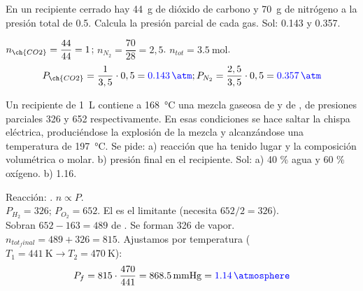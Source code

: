 \begin{exercise}
    En un recipiente cerrado hay \qty{44}{\g} de dióxido de carbono y \qty{70}{\g} de nitrógeno a la presión total de \qty{0.5}{\atm}. Calcula la presión parcial de cada gas.
    Sol: \qty{0.143}{\atm} y \qty{0.357}{\atm}.
    \begin{solu}
        $n_{\ch{CO2}} = \dfrac{44}{44} = 1$; $n_{N_2} = \dfrac{70}{28} = 2,5$. $n_{tot} = \qty{3,5}{\mol}$.
        \[ P_{\ch{CO2}} = \dfrac{1}{3,5} \cdot 0,5 = \mathbf{\textcolor{blue}{\qty{0,143}{\atm}}} ; P_{N_2} = \dfrac{2,5}{3,5} \cdot 0,5 = \mathbf{\textcolor{blue}{\qty{0,357}{\atm}}} \]
    \end{solu}
\end{exercise}

\begin{exercise}
    Un recipiente de \qty{1}{\L} contiene a \qty{168}{\celsius} una mezcla gaseosa de  y de , de presiones parciales 326 y 652 \unit{\mmhg} respectivamente. En esas condiciones se hace saltar la chispa eléctrica, produciéndose la explosión de la mezcla y alcanzándose una temperatura de  \qty{197}{\celsius}. Se pide: a) reacción que ha tenido lugar y la composición volumétrica o molar. b) presión final en el recipiente.
    Sol: a) 40 \% agua y 60 \% oxígeno. b) \qty{1.16}{\atm}.
    \begin{solu}
        Reacción: . $n \propto P$. \\
        $P_{H_2} = 326$; $P_{O_2} = 652$. El  es el limitante (necesita $652/2 = 326$). \\
        Sobran $652 - 163 = 489$ de . Se forman 326 de  vapor. \\
        $n_{tot_final} = 489 + 326 = 815$. Ajustamos por temperatura ($T_1 =\qty{441}{\kelvin} \rightarrow  T_2  = \qty{470}{\kelvin} $):
        \[ P_{f} = 815 \cdot \dfrac{470}{441} = \qty{868,5}{\mmHg} = \mathbf{\textcolor{blue}{\qty{1,14}{\atmosphere}}} \]
    \end{solu}
\end{exercise}

